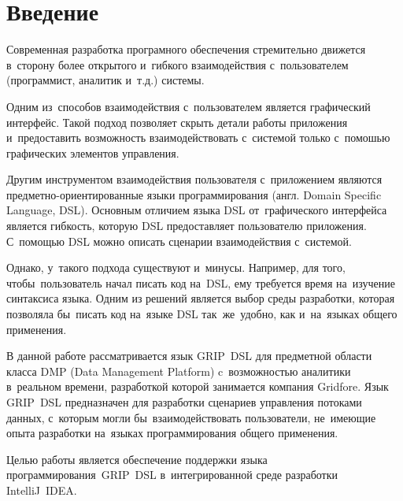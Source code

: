 \chapter*{Введение}                         %



Современная разработка програмного обеспечения стремительно движется в~сторону более открытого и~гибкого взаимодействия с~пользователем (программист, аналитик и~т.д.) системы. 

Одним из~способов взаимодействия с~пользователем является графический интерфейс. Такой подход позволяет скрыть детали работы приложения и~предоставить возможность взаимодействовать с~системой только с~помошью графических элементов управления.

Другим инструментом взаимодействия пользователя с~приложением являются предметно-ориентированные языки программирования (англ. Domain Specific Language, DSL). Основным отличием языка DSL от~графического интерфейса является гибкость, которую DSL предоставляет пользователю приложения. С~помощью DSL можно описать сценарии взаимодействия с~системой. 

Однако, у~такого подхода существуют и~минусы. Например, для того, чтобы~пользователь начал писать код на~DSL, ему требуется время на~изучение синтаксиса языка. Одним из решений является выбор среды разработки, которая позволяла бы~писать код на~языке DSL так~же~удобно, как и~на~языках общего применения. 

В данной работе рассматривается язык GRIP~DSL для предметной области класса DMP (Data Management Platform) c~возможностью аналитики в~реальном времени, разработкой которой занимается компания Gridfore. Язык GRIP~DSL предназначен для разработки сценариев управления потоками данных, с~которым могли бы~взаимодействовать пользователи, не~имеющие опыта разработки на~языках программирования общего применения.

Целью работы является обеспечение поддержки языка программирования~GRIP~DSL в~интегрированной среде разработки IntelliJ~IDEA.

